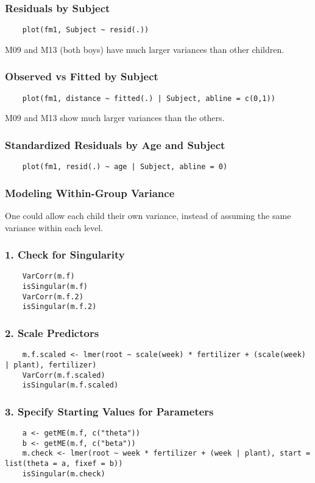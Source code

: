 \documentclass{beamer}
\begin{document}
\begin{frame}[fragile]
    \frametitle{Residuals by Subject}
    \lstset{style=Rstyle}
    \begin{lstlisting}
    plot(fm1, Subject ~ resid(.))
    \end{lstlisting}
    M09 and M13 (both boys) have much larger variances than other children.
\end{frame}

\begin{frame}[fragile]
    \frametitle{Observed vs Fitted by Subject}
    \lstset{style=Rstyle}
    \begin{lstlisting}
    plot(fm1, distance ~ fitted(.) | Subject, abline = c(0,1))
    \end{lstlisting}
    M09 and M13 show much larger variances than the others.
\end{frame}

\begin{frame}[fragile]
    \frametitle{Standardized Residuals by Age and Subject}
    \lstset{style=Rstyle}
    \begin{lstlisting}
    plot(fm1, resid(.) ~ age | Subject, abline = 0)
    \end{lstlisting}
\end{frame}

\begin{frame}
    \frametitle{Modeling Within-Group Variance}
    One could allow each child their own variance, instead of assuming the same variance within each level.
\end{frame}

\begin{frame}[fragile]
    \frametitle{1. Check for Singularity}
    \lstset{style=Rstyle}
    \begin{lstlisting}
    VarCorr(m.f)
    isSingular(m.f)
    VarCorr(m.f.2)
    isSingular(m.f.2)
    \end{lstlisting}
\end{frame}

\begin{frame}[fragile]
    \frametitle{2. Scale Predictors}
    \lstset{style=Rstyle}
    \begin{lstlisting}
    m.f.scaled <- lmer(root ~ scale(week) * fertilizer + (scale(week) | plant), fertilizer)
    VarCorr(m.f.scaled)
    isSingular(m.f.scaled)
    \end{lstlisting}
\end{frame}

\begin{frame}[fragile]
    \frametitle{3. Specify Starting Values for Parameters}
    \lstset{style=Rstyle}
    \begin{lstlisting}
    a <- getME(m.f, c("theta"))
    b <- getME(m.f, c("beta"))
    m.check <- lmer(root ~ week * fertilizer + (week | plant), start = list(theta = a, fixef = b))
    isSingular(m.check)
    \end{lstlisting}
\end{frame}
\end{document}
